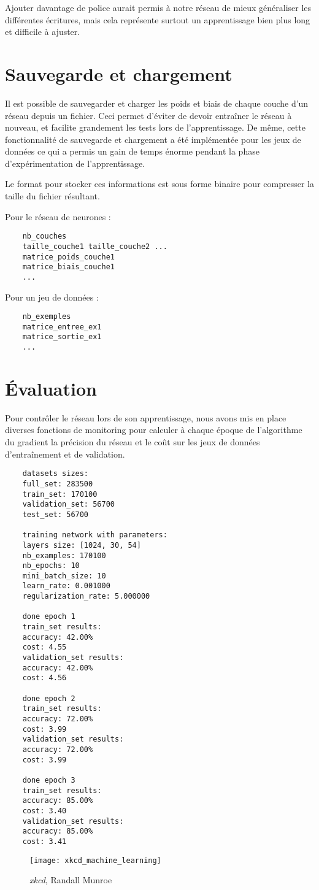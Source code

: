 Ajouter davantage de police aurait permis à notre réseau de mieux généraliser
les différentes écritures, mais cela représente surtout un apprentissage bien
plus long et difficile à ajuster.

\section{Sauvegarde et chargement}

Il est possible de sauvegarder et charger les poids et biais de chaque couche
d'un réseau depuis un fichier. Ceci permet d'éviter de devoir entraîner le
réseau à nouveau, et facilite grandement les tests lors de l'apprentissage. De
même, cette fonctionnalité de sauvegarde et chargement a été implémentée pour
les jeux de données ce qui a permis un gain de temps énorme pendant la phase
d'expérimentation de l'apprentissage.

Le format pour stocker ces informations est sous forme binaire pour compresser la
taille du fichier résultant.

Pour le réseau de neurones :

\begin{verbatim}
    nb_couches
    taille_couche1 taille_couche2 ...
    matrice_poids_couche1
    matrice_biais_couche1
    ...
\end{verbatim}

Pour un jeu de données :

\begin{verbatim}
    nb_exemples
    matrice_entree_ex1
    matrice_sortie_ex1
    ...
\end{verbatim}

\section{Évaluation}

Pour contrôler le réseau lors de son apprentissage, nous avons mis en place
diverses fonctions de monitoring pour calculer à chaque époque de l'algorithme
du gradient la précision du réseau et le coût sur les jeux de données
d'entraînement et de validation.

\begin{verbatim}
    datasets sizes:
    full_set: 283500
    train_set: 170100
    validation_set: 56700
    test_set: 56700

    training network with parameters:
    layers size: [1024, 30, 54]
    nb_examples: 170100
    nb_epochs: 10
    mini_batch_size: 10
    learn_rate: 0.001000
    regularization_rate: 5.000000

    done epoch 1
    train_set results:
    accuracy: 42.00%
    cost: 4.55
    validation_set results:
    accuracy: 42.00%
    cost: 4.56

    done epoch 2
    train_set results:
    accuracy: 72.00%
    cost: 3.99
    validation_set results:
    accuracy: 72.00%
    cost: 3.99

    done epoch 3
    train_set results:
    accuracy: 85.00%
    cost: 3.40
    validation_set results:
    accuracy: 85.00%
    cost: 3.41
\end{verbatim}

\newpage

\begin{figure}[H]
    \centering
    \texttt{[image: xkcd\_machine\_learning]}
    \caption*{\textit{xkcd}, Randall Munroe}
\end{figure}
